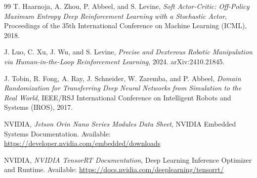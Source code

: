 \documentclass[titlepage]{pnureport}
\begin{document}
\begin{thebibliography}{99}
T. Haarnoja, A. Zhou, P. Abbeel, and S. Levine,
\textit{Soft Actor-Critic: Off-Policy Maximum Entropy Deep Reinforcement Learning with a Stochastic Actor},
Proceedings of the 35th International Conference on Machine Learning (ICML), 2018.

J. Luo, C. Xu, J. Wu, and S. Levine,
\textit{Precise and Dexterous Robotic Manipulation via Human-in-the-Loop Reinforcement Learning}, 2024. arXiv:2410.21845.

J. Tobin, R. Fong, A. Ray, J. Schneider, W. Zaremba, and P. Abbeel,
\textit{Domain Randomization for Transferring Deep Neural Networks from Simulation to the Real World},
IEEE/RSJ International Conference on Intelligent Robots and Systems (IROS), 2017.

NVIDIA,
\textit{Jetson Orin Nano Series Modules Data Sheet}, NVIDIA Embedded Systems Documentation.
Available: \url{https://developer.nvidia.com/embedded/downloads}

NVIDIA,
\textit{NVIDIA TensorRT Documentation}, Deep Learning Inference Optimizer and Runtime.
Available: \url{https://docs.nvidia.com/deeplearning/tensorrt/}

\end{thebibliography}
\end{document}
